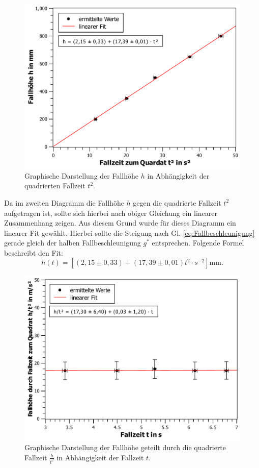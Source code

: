 			\begin{figure}[ht]
				\centering
				\includegraphics[width=\textwidth]{h-gegen-t2.pdf}
				\caption{Graphische Darstellung der Fallhöhe $h$ in Abhängigkeit der quadrierten Fallzeit $t^2$.}
				\label{fig:hgegent2}	
			\end{figure}	
			Da im zweiten Diagramm die Fallhöhe $h$ gegen die quadrierte Fallzeit $t^2$ aufgetragen ist, sollte sich hierbei nach obiger Gleichung ein linearer Zusammenhang zeigen. Aus diesem Grund wurde für dieses Diagramm ein linearer Fit gewählt. Hierbei sollte die Steigung nach Gl. \ref{eq:Fallbeschleunigung} gerade gleich der halben Fallbeschleunigung $g^{*}$ entsprechen. Folgende Formel beschreibt den Fit:
			\begin{equation*}
				h(t) = [(2,15 \pm 0,33)+(17,39 \pm 0,01)t^2\cdot\si{s^{-2}}]\si{\mm}.
			\end{equation*} 
			\begin{figure}[ht]
				\centering
				\includegraphics[width=\textwidth]{ht2-gegen-t.pdf}
				\caption{Graphische Darstellung der Fallhöhe geteilt durch die quadrierte Fallzeit $\frac{h}{t^2}$ in Abhängigkeit der Fallzeit $t$.}
				\label{fig:ht2gegent}	
			\end{figure}
